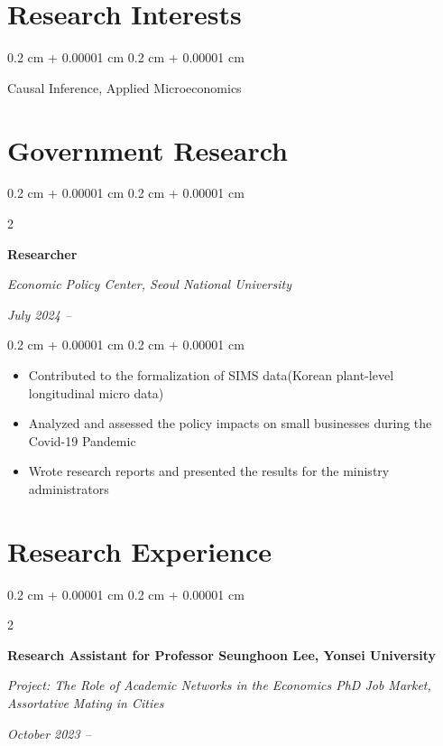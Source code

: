 \documentclass[10pt, letterpaper]{article}
\newenvironment{highlights}{
	\begin{itemize}[
		topsep=0.10 cm,
		parsep=0.10 cm,
		partopsep=0pt,
		itemsep=0pt,
		leftmargin=0.4 cm + 10pt
		]
	}{
	\end{itemize}
} %
\newenvironment{onecolentry}{
	\begin{adjustwidth}{
			0.2 cm + 0.00001 cm
		}{
			0.2 cm + 0.00001 cm
		}
	}{
	\end{adjustwidth}
} %
\newenvironment{twocolentry}[2][]{
	\onecolentry
	\def\secondColumn{#2}
	\setcolumnwidth{\fill, 4.5 cm}
	\begin{paracol}{2}
	}{
		\switchcolumn \raggedleft \secondColumn
	\end{paracol}
	\endonecolentry
} %
\begin{document}
	
	
	
		\section{Research Interests}
	
	\begin{onecolentry}
Causal Inference, Applied Microeconomics
	\end{onecolentry}
	
	\vspace{0.2 cm}
	
	
	\section{Government Research}
		\begin{twocolentry}{
			\textit{July 2024 –}    
			
			\textit{}}
		\textbf{Researcher}
		
		\textit{Economic Policy Center, Seoul National University}
	\end{twocolentry}
	
	\vspace{0.10 cm}
	\begin{onecolentry}
		\begin{highlights}
			\item Contributed to the formalization of SIMS data(Korean plant-level longitudinal micro data)
			\item Analyzed and assessed the policy impacts on small businesses during the Covid-19 Pandemic
			\item Wrote research reports and presented the results for the ministry administrators
		\end{highlights}
	\end{onecolentry}
	
	
	\vspace{0.2 cm}
	
	\section{Research Experience}
	
			\begin{twocolentry}{
			\textit{October 2023 –}    
			
			\textit{}}
		\textbf{Research Assistant for Professor Seunghoon Lee, Yonsei University}
		
		\textit{Project: The Role of Academic Networks in the Economics PhD Job Market, Assortative Mating in Cities }
	\end{twocolentry}
	
\end{document}
